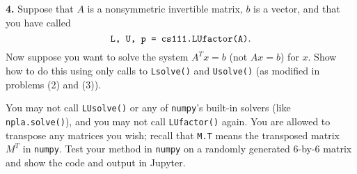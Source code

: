 \documentclass[11pt]{article}
\begin{document}
\par\bigskip
{\bf 4.}
Suppose that $A$ is a nonsymmetric invertible matrix, 
$b$ is a vector, and that you have called 
$$\mbox{\tt L, U, p = cs111.LUfactor(A)}.$$
Now suppose you want to solve the system $A^Tx=b$ (not $Ax=b$) for $x$.
Show how to do this using only calls to {\tt Lsolve()} and {\tt Usolve()}
(as modified in problems (2) and (3)).

You may not call {\tt LUsolve()} or any of {\tt numpy}'s built-in solvers (like {\tt npla.solve()}),
and you may not call {\tt LUfactor()} again.
You are allowed to transpose any matrices you wish;
recall that {\tt M.T} means the transposed matrix $M^T$ in {\tt numpy}.
Test your method in {\tt numpy} on a randomly generated 6-by-6 matrix
and show the code and output in Jupyter.
\end{document}
